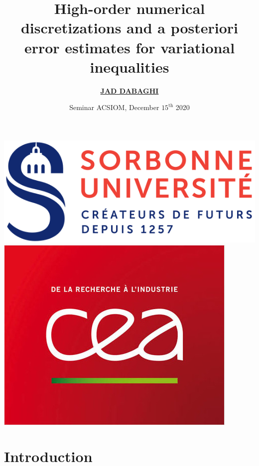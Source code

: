 \documentclass[aspectratio=169]{beamer}
\title{High-order numerical
discretizations and a posteriori error estimates for variational inequalities}
\author{\underline{\textbf{JAD DABAGHI}}}
\institute[]{CEA Paris Saclay \& Sorbonne Université}
\date{Seminar ACSIOM, December $15^{\mathrm{th}}$ 2020}
\begin{document}
\begin{frame}
\maketitle
\includegraphics[scale=0.2]{logo_sorbonne}
\hfill 
\includegraphics[scale=0.13]{CEA}

\end{frame}



\section{Introduction}
\end{document}
